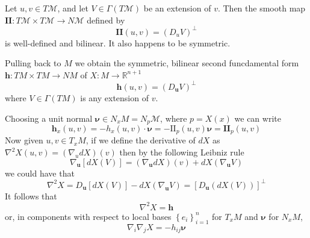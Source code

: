 \begin{lemma}\label{lem:H-1-1}
    Let $u,v\in T\mathcal{M}$, and let $V\in\Gamma(T\mathcal{M})$ be an extension of $v$. Then the smooth map $\mathbf{II}:T\mathcal{M}\times T\mathcal{M}\to N\mathcal{M}$ defined by
    \begin{equation}\label{eq:H-1-2}
        \mathbf{II}(u,v)={(D_u V)}^\bot
    \end{equation}
    is well-defined and bilinear. It also happens to be symmetric.
\end{lemma}

Pulling back to $M$ we obtain the symmetric, bilinear second funcdamental form $\boldsymbol{h}:TM\times TM\to NM$ of $X:M\to \mathbb{R}^{n+1}$
\begin{equation}\label{eq:H-1-3}
    \boldsymbol{h}(u,v)={\left(D_{\boldsymbol{u}}V\right)}^\bot
\end{equation}
where $V\in\Gamma(TM)$ is any extension of $v$.

Choosing a unit normal $\boldsymbol{\nu}\in N_x M=N_p\mathcal{M}$, where $p=X(x)$ we can write
\begin{equation*}
    {\boldsymbol{h}}_x(u,v)=-h_{x}(u,v)\cdot\boldsymbol{\nu}=-\mathrm{II}_p(u,v)\boldsymbol{\nu}=\mathbf{II}_p(u,v)
\end{equation*}
Now given $u,v\in T_x M$, if we define the derivative of $dX$ as $\nabla^2 X(u,v)=(\nabla_u dX)(v)$ then by the following Leibniz rule
\begin{equation*}
    \nabla_{\boldsymbol{u}}[dX(V)]=(\nabla_{\boldsymbol{u}}dX)(v)+dX(\nabla_{\boldsymbol{u}}V)
\end{equation*}
we could have that
\begin{equation*}
    \nabla^2 X=D_{\boldsymbol{u}}[dX(V)]-dX(\nabla_{\boldsymbol{u}}V)={[D_{\boldsymbol{u}}(dX(V))]}^\bot
\end{equation*}
It follows that
\begin{equation*}
    \nabla^2 X=\boldsymbol{h}
\end{equation*}
or, in components with respect to local bases ${\left\{e_i\right\}}^n_{i=1}$ for $T_x M$ and $\boldsymbol{\nu}$ for $N_x M$,
\begin{equation*}
    \nabla_i\nabla_j X=-h_{ij}\boldsymbol{\nu}
\end{equation*}

